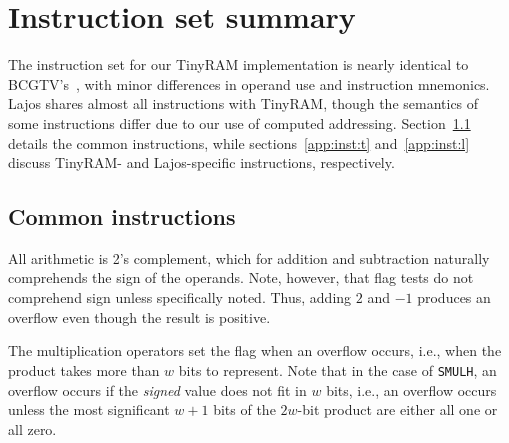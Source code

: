 \documentclass[10pt,letterpaper]{article}
\newcommand{\bcgtv}{BCGTV}
\begin{document}
\section{Instruction set summary}

The instruction set for our TinyRAM implementation is nearly identical to \bcgtv's~\cite{TinyRAM}, with minor differences in operand use and instruction mnemonics. Lajos shares almost all instructions with TinyRAM, though the semantics of some instructions differ due to our use of computed addressing. Section~\ref{app:inst:c} details the common instructions, while sections~\ref{app:inst:t} and~\ref{app:inst:l} discuss TinyRAM- and Lajos-specific instructions, respectively.

\subsection{Common instructions}\label{app:inst:c}

All arithmetic is 2's complement, which for addition and subtraction naturally comprehends the sign of the operands. Note, however, that flag tests do not comprehend sign unless specifically noted. Thus, adding $2$ and $-1$ produces an overflow even though the result is positive.

The multiplication operators set the flag when an overflow occurs, i.e., when the product takes more than $w$ bits to represent. Note that in the case of \texttt{SMULH}, an overflow occurs if the \emph{signed} value does not fit in $w$ bits, i.e., an overflow occurs unless the most significant $w+1$ bits of the $2w$-bit product are either all one or all zero.
\end{document}
